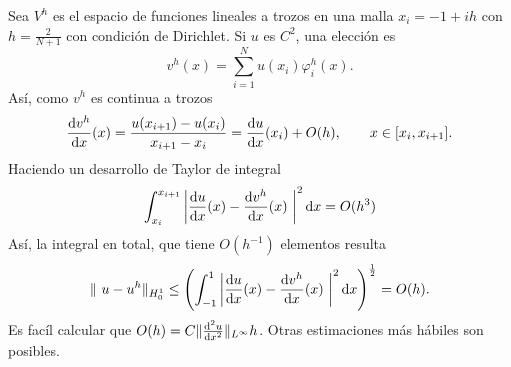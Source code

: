 Sea \(V^h\) es el espacio de funciones lineales a trozos en una malla
\(x_i = -1 + i h\) con \(h = \frac 2 {N+1}\) con condición de Dirichlet.
Si \(u\) es \(C^2\), una elección es \[
    v^h (x) = \sum_{i=1}^N u(x_i) \varphi_i^h (x).
\] Así, como \(v^h\) es continua a trozos \[
    \frac{\mathrm{d} v^h}{\mathrm{d} x} (x) = \frac{u(x_{i+1}) - u(x_i)}{x_{i+1} - x_i } = \frac{\mathrm{d} u}{\mathrm{d} x} (x_i) + O(h), \qquad x \in [x_i, x_{i+1}].
\] Haciendo un desarrollo de Taylor de integral \[
    \int_{x_i}^{x_{i+1}} \left| \frac{\diff u}{\diff x} (x) - \frac{\diff v^h}{\diff x} (x)   \right|^2 \diff x = O( h^3 )
\] Así, la integral en total, que tiene \(O(h^{ -1})\) elementos resulta
\[
    \| u - u^h \|_{H^1_0} \le \left( \int_{-1}^{1} \left| \frac{\diff u}{\diff x} (x) - \frac{\diff v^h}{\diff x} (x)   \right|^2 \diff x \right)^{\frac 1 2} = O( h ).
\] Es facíl calcular que
\(O(h) = C \| \frac{\mathrm{d}^2 u}{\mathrm{d} x^2} \|_{L^\infty} h\). Otras
estimaciones más hábiles son posibles.


